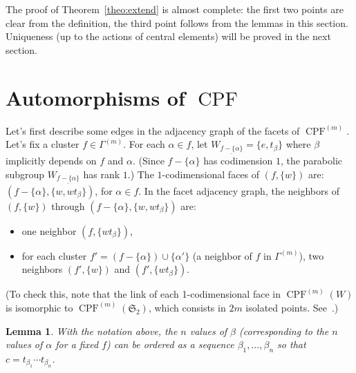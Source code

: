 \documentclass[11pt]{article}
\newtheorem{lemm}[theo]{Lemma}
\theoremstyle{definition}
\DeclareMathOperator{\CPF}{CPF}
\begin{document}
The proof of Theorem~\ref{theo:extend} is almost complete: the first two points are clear from the definition, the third point follows from the lemmas in this section.  Uniqueness (up to the actions of central elements) will be proved in the next section.

\section{\texorpdfstring{Automorphisms of $\CPF$}{Automorphisms of CPF}}
\label{sec:unicity}

Let's first describe some edges in the adjacency graph of the facets of $\CPF^{(m)}$.  Let's fix a cluster $f\in\Gamma^{(m)}$.  For each $\alpha\in f$, let $W_{\underline{f-\{\alpha\}}} = \{e , t_\beta \}$ where $\beta$ implicitly depends on $f$ and $\alpha$.  (Since $f-\{\alpha\}$ has codimension $1$, the parabolic subgroup $W_{\underline{f-\{\alpha\}}}$ has rank $1$.)
The $1$-codimensional faces of $(f,\{w\})$ are: $(f-\{\alpha\},\{w,wt_\beta\})$, for $\alpha \in f$. In the facet adjacency graph, the neighbors of $(f,\{w\})$ through $(f-\{\alpha\},\{w,wt_\beta\})$ are:
\begin{itemize}
    \item one neighbor $(f,\{w t_\beta\})$,
    \item for each cluster $f' = (f-\{\alpha\}) \cup \{\alpha'\}$ (a neighbor of $f$ in $\Gamma^{(m)}$), two neighbors $(f',\{w\})$ and $(f',\{wt_\beta\})$.
\end{itemize}

(To check this, note that the link of each 1-codimensional face in $\CPF^{(m)}(W)$ is isomorphic to $\CPF^{(m)}(\mathfrak{S}_2)$, which consists in $2m$ isolated points. 
 See~\cite[Proposition~3.6]{douvropoulosjosuatverges2}.)

\begin{lemm} \label{lemm:betagen}
    With the notation above, the $n$ values of $\beta$ (corresponding to the $n$ values of $\alpha$ for a fixed $f$) can be ordered as a sequence $\beta_1,\dots,\beta_n$ so that $c = t_{\beta_1} \cdots t_{\beta_n}$.
\end{lemm}
\end{document}
